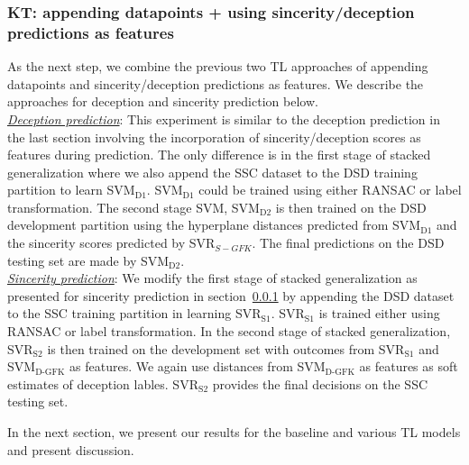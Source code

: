 \documentclass{article}
\begin{document}
\subsubsection{KT: appending datapoints + using sincerity/deception predictions as features}
As the next step, we combine the previous two TL approaches of appending datapoints and sincerity/deception predictions as features.
We describe the approaches for deception and sincerity prediction below.
\\

\noindent\underline{\it Deception prediction}: 
This experiment is similar to the deception prediction in the last section involving the incorporation of sincerity/deception scores as features during prediction.
The only difference is in the first stage of stacked generalization where we also append the SSC dataset to the DSD training partition to learn SVM$_\text{D1}$. 
SVM$_\text{D1}$ could be trained using either RANSAC or label transformation.
The second stage SVM, SVM$_\text{D2}$ is then trained on the DSD development partition using the hyperplane distances predicted from SVM$_\text{D1}$ and the sincerity scores predicted by SVR$_{S-GFK}$. 
The final predictions on the DSD testing set are made by SVM$_\text{D2}$.
\\

\noindent\underline{\it Sincerity prediction}:
We modify the first stage of stacked generalization as presented for sincerity prediction in section~\ref{} by appending the DSD dataset to the SSC training partition in learning SVR$_\text{S1}$.
SVR$_\text{S1}$ is trained either using RANSAC or label transformation. 
In the second stage of stacked generalization, SVR$_\text{S2}$ is then trained on the development set with outcomes from SVR$_\text{S1}$ and SVM$_\text{D-GFK}$ as features.
We again use distances from SVM$_\text{D-GFK}$ as features as soft estimates of deception lables. 
SVR$_\text{S2}$ provides the final decisions on the SSC testing set.

In the next section, we present our results for the baseline and various TL models and present discussion.
\end{document}
